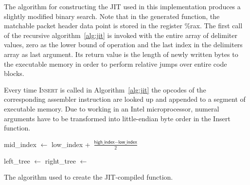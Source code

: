 \documentclass[a4paper,
		12pt,
		parskip=full,
		titlepage
		]{scrartcl}
\begin{document}
The algorithm for constructing the JIT used in this implementation produces a slightly modified binary search.
Note that in the generated function, the matchable packet header data point is stored in the register \textsf{\%rax}.
The first call of the recursive algorithm~\ref{alg:jit} is invoked with the entire array of delimiter values,
zero as the lower bound of operation and the last index in the delimiters array as last argument.
Its return value is the length of newly written bytes to the executable memory in order to perform relative jumps over entire code blocks.

Every time \textsc{Insert} is called in Algorithm~\ref{alg:jit} the opcodes 
of the corresponding assembler instruction are looked up and appended to a segment of executable memory.
Due to working in an Intel microprocessor, numeral arguments have to be 
transformed into little-endian byte order in the \textsf{Insert} function.

\begin{algorithm}
\begin{algorithmic}
    \State mid\_index $\gets$ low\_index + $\frac{\textsf{high\_index} - \textsf{low\_index}}{2}$
    
     
        \State {}
        \State {}
        \State {}
        \State {} 
        \State {}
    \EndIf
    
    \State left\_tree $\gets$ 
    \State right\_tree $\gets$ 
    
    \State {}
    \State {}
    \State {}
    \State {}
    \State {}
    \State {}
    \State {}
    \State {}
\EndFunction
\end{algorithmic}
\caption{The algorithm used to create the JIT-compiled function.}
\label{alg:jit}
\end{algorithm}
\end{document}
